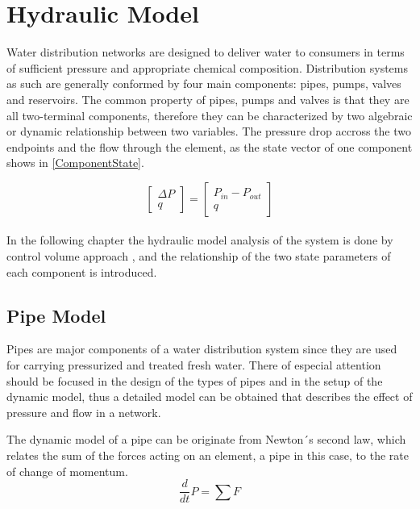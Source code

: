 \section{Hydraulic Model}
\label{HydraulicModel}

Water distribution networks are designed to deliver water  to consumers in terms of sufficient pressure and appropriate chemical composition. Distribution systems as such are generally conformed by four main components: pipes, pumps, valves and reservoirs. The common property of pipes, pumps and valves is that they are all two-terminal components, therefore they can be characterized by two algebraic or dynamic relationship between two variables. The pressure drop accross the two endpoints and the flow through the element, as the state vector of one component shows in \eqref{ComponentState}. \cite{Kallesoe2009} 

\begin{equation}
\label{ComponentState}
 \begin{bmatrix}
    \Delta P \\
    q
\end{bmatrix}
=
 \begin{bmatrix}
    P_{in} - P_{out} \\
    q
\end{bmatrix}
\end{equation}
\\
In the following chapter the hydraulic model analysis of the system is done by control volume approach \cite{Hunt_Fluidmechanics}, 
and the relationship of the two state parameters of each component is introduced.

\subsection{Pipe Model} 
\label{PipeModel}
Pipes are major components of a water distribution system since they are used for carrying pressurized and treated fresh water. There  of especial attention should be focused in the design of the types of pipes and in the setup of the dynamic model, thus a detailed model can be obtained that describes the effect of pressure and flow in a network. 

The dynamic model of a pipe can be originate from Newton´s second law, which relates the sum of the 
forces acting on an element, a pipe in this case, to the rate of change of momentum.
\begin{equation}
  \frac{d}{dt} P = \sum F
  \label{NewtonLaw}
\end{equation} 

